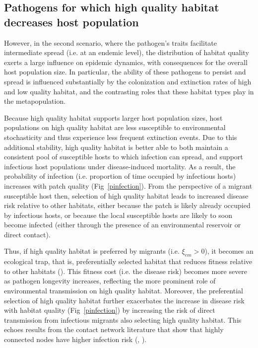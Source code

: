 \documentclass{article}
\begin{document}
\subsection*{Pathogens for which high quality habitat decreases host population}

However, in the second scenario, where the pathogen's traits facilitate intermediate spread (i.e. at an endemic level), the distribution of habitat quality exerts a large influence on epidemic dynamics, with consequences for the overall host population size.
In particular, the ability of these pathogens to persist and spread is influenced substantially by the colonization and extinction rates of high and low quality habitat, and the contrasting roles that these habitat types play in the metapopulation.
 
Because high quality habitat supports larger host population sizes, host populations on high quality habitat are less susceptible to environmental stochasticity and thus experience less frequent extinction events.
Due to this additional stability, high quality habitat is better able to both maintain a consistent pool of susceptible hosts to which infection can spread, and support infectious host populations under disease-induced mortality. 
As a result, the probability of infection (i.e. proportion of time occupied by infectious hosts) increases with patch quality (Fig~\ref{pinfection}).
From the perspective of a migrant susceptible host then, selection of high quality habitat leads to increased disease risk relative to other habitats, either because the patch is likely already occupied by infectious hosts, or because the local susceptible hosts are likely to soon become infected (either through the presence of an environmental reservoir or direct contact).

Thus, if high quality habitat is preferred by migrants (i.e. $\xi_{em} > 0$), it becomes an ecological trap, that is, preferentially selected habitat that reduces fitness relative to other habitats (\cite{Robertson2006}).
This fitness cost (i.e. the disease risk) becomes more severe as pathogen longevity increases, reflecting the more prominent role of environmental transmission on high quality habitat.
Moreover, the preferential selection of high quality habitat further exacerbates the increase in disease risk with habitat quality (Fig~\ref{pinfection}) by increasing the risk of direct transmission from infectious migrants also selecting high quality habitat.
This echoes results from the contact network literature that show that highly connected nodes have higher infection risk (\cite{Christley2005}, \cite{Keeling2005}).
\end{document}
